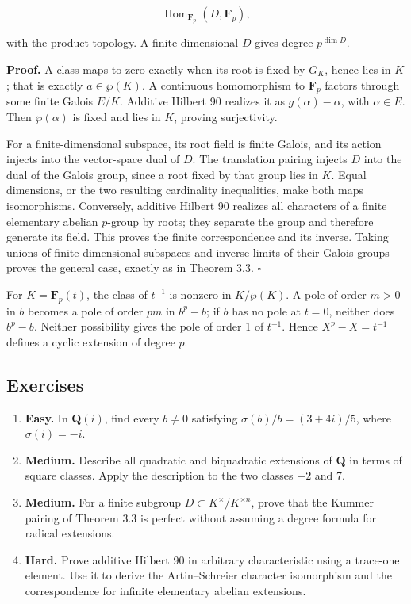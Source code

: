 \documentclass[11pt,a4paper]{article}
\newcommand{\tightlist}{\setlength{\itemsep}{0pt}\setlength{\parskip}{0pt}}
\begin{document}
\[
\operatorname{Hom}_{\mathbf F_p}(D,\mathbf F_p),
\]

with the product topology. A finite-dimensional \(D\) gives degree
\(p^{\dim D}\).

\textbf{Proof.} A class maps to zero exactly when its root is fixed by
\(G_K\), hence lies in \(K\); that is exactly \(a\in\wp(K)\). A
continuous homomorphism to \(\mathbf F_p\) factors through some finite
Galois \(E/K\). Additive Hilbert 90 realizes it as \(g(\alpha)-\alpha\),
with \(\alpha\in E\). Then \(\wp(\alpha)\) is fixed and lies in \(K\),
proving surjectivity.

For a finite-dimensional subspace, its root field is finite Galois, and
its action injects into the vector-space dual of \(D\). The translation
pairing injects \(D\) into the dual of the Galois group, since a root
fixed by that group lies in \(K\). Equal dimensions, or the two
resulting cardinality inequalities, make both maps isomorphisms.
Conversely, additive Hilbert 90 realizes all characters of a finite
elementary abelian \(p\)-group by roots; they separate the group and
therefore generate its field. This proves the finite correspondence and
its inverse. Taking unions of finite-dimensional subspaces and inverse
limits of their Galois groups proves the general case, exactly as in
Theorem 3.3. \(\square\)

For \(K=\mathbf F_p(t)\), the class of \(t^{-1}\) is nonzero in
\(K/\wp(K)\). A pole of order \(m>0\) in \(b\) becomes a pole of order
\(pm\) in \(b^p-b\); if \(b\) has no pole at \(t=0\), neither does
\(b^p-b\). Neither possibility gives the pole of order 1 of \(t^{-1}\).
Hence \(X^p-X=t^{-1}\) defines a cyclic extension of degree \(p\).

\subsection{Exercises}\label{exercises}

\begin{enumerate}
\def\labelenumi{\arabic{enumi}.}
\tightlist
\item
  \textbf{Easy.} In \(\mathbf Q(i)\), find every \(b\ne0\) satisfying
  \(\sigma(b)/b=(3+4i)/5\), where \(\sigma(i)=-i\).
\item
  \textbf{Medium.} Describe all quadratic and biquadratic extensions of
  \(\mathbf Q\) in terms of square classes. Apply the description to the
  two classes \(-2\) and 7.
\item
  \textbf{Medium.} For a finite subgroup
  \(D\subset K^\times/K^{\times n}\), prove that the Kummer pairing of
  Theorem 3.3 is perfect without assuming a degree formula for radical
  extensions.
\item
  \textbf{Hard.} Prove additive Hilbert 90 in arbitrary characteristic
  using a trace-one element. Use it to derive the Artin--Schreier
  character isomorphism and the correspondence for infinite elementary
  abelian extensions.
\end{enumerate}
\end{document}
